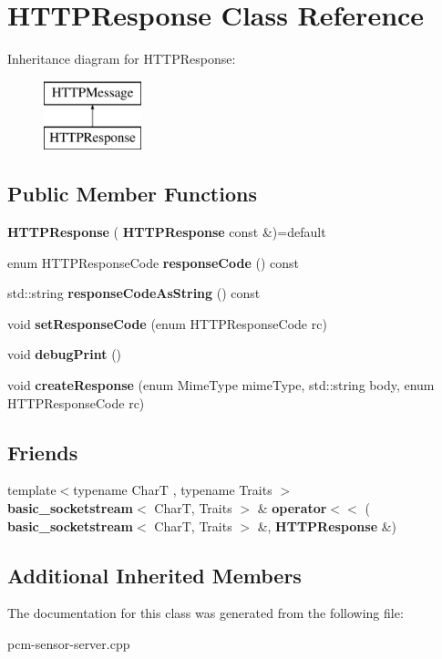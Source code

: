 \section{H\+T\+T\+P\+Response Class Reference}
\label{classHTTPResponse}
Inheritance diagram for H\+T\+T\+P\+Response\+:\begin{figure}[H]
\begin{center}
\leavevmode
\includegraphics[height=2.000000cm]{classHTTPResponse}
\end{center}
\end{figure}
\subsection*{Public Member Functions}
\begin{DoxyCompactItemize}
\item 
\mbox{\label{classHTTPResponse_aec8be15029525ed7e2455e43253ba168}} 
{\bfseries H\+T\+T\+P\+Response} (\textbf{ H\+T\+T\+P\+Response} const \&)=default
\item 
\mbox{\label{classHTTPResponse_a5c9b35f1bdc040ac299d559ec77a8f8f}} 
enum H\+T\+T\+P\+Response\+Code {\bfseries response\+Code} () const
\item 
\mbox{\label{classHTTPResponse_ae475112d2ea6dc7d4bf9ce8889b923d8}} 
std\+::string {\bfseries response\+Code\+As\+String} () const
\item 
\mbox{\label{classHTTPResponse_a39157c106c71501f01bdbfabdff83ff1}} 
void {\bfseries set\+Response\+Code} (enum H\+T\+T\+P\+Response\+Code rc)
\item 
\mbox{\label{classHTTPResponse_a1dba64e4bd727ca7d4f8b025882fce42}} 
void {\bfseries debug\+Print} ()
\item 
\mbox{\label{classHTTPResponse_a029af650eb64f34f417accddfc5c377f}} 
void {\bfseries create\+Response} (enum Mime\+Type mime\+Type, std\+::string body, enum H\+T\+T\+P\+Response\+Code rc)
\end{DoxyCompactItemize}
\subsection*{Friends}
\begin{DoxyCompactItemize}
\item 
\mbox{\label{classHTTPResponse_a8e19bc0ac41cdd7c1d1dbac386dbd84a}} 
{\footnotesize template$<$typename CharT , typename Traits $>$ }\\\textbf{ basic\+\_\+socketstream}$<$ CharT, Traits $>$ \& {\bfseries operator$<$$<$} (\textbf{ basic\+\_\+socketstream}$<$ CharT, Traits $>$ \&, \textbf{ H\+T\+T\+P\+Response} \&)
\end{DoxyCompactItemize}
\subsection*{Additional Inherited Members}


The documentation for this class was generated from the following file\+:\begin{DoxyCompactItemize}
\item 
pcm-\/sensor-\/server.\+cpp\end{DoxyCompactItemize}
